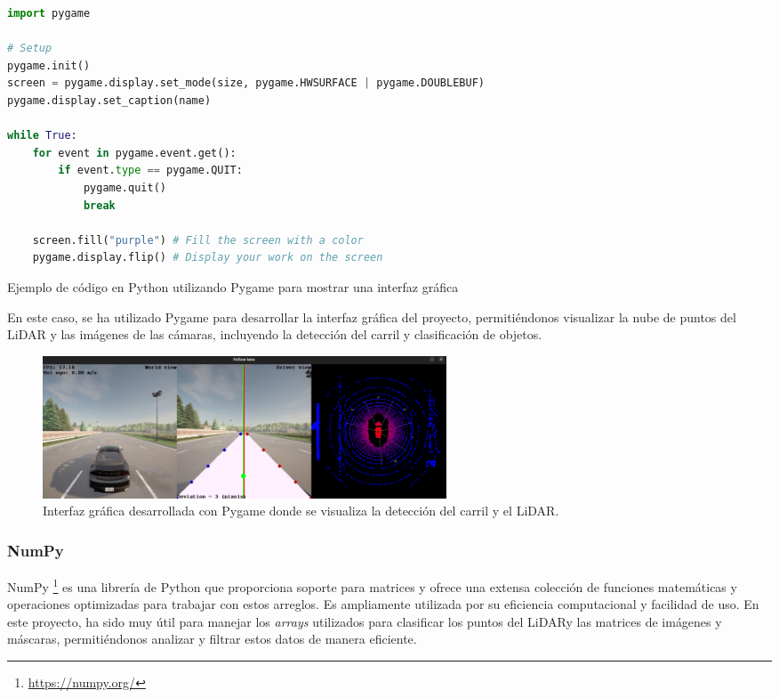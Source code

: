 \begin{code}[h]
\begin{lstlisting}[language=Python]
import pygame

# Setup
pygame.init()
screen = pygame.display.set_mode(size, pygame.HWSURFACE | pygame.DOUBLEBUF)
pygame.display.set_caption(name)

while True:
	for event in pygame.event.get():
		if event.type == pygame.QUIT:
			pygame.quit()
			break

	screen.fill("purple") # Fill the screen with a color
	pygame.display.flip() # Display your work on the screen
\end{lstlisting}
\caption[Ejemplo de código en Python utilizando Pygame]{Ejemplo de código en Python utilizando Pygame para mostrar una interfaz gráfica}
\label{cod:pygame}
\end{code}

En este caso, se ha utilizado Pygame para desarrollar la interfaz gráfica del proyecto, permitiéndonos visualizar la nube de puntos del \ac{LiDAR} y las imágenes de las cámaras, incluyendo la detección del carril y clasificación de objetos.

\begin{figure}[ht]
\begin{center}
\includegraphics[width=12cm]{figs/Plataformas_Desarollo/pygame.png}
\end{center}
\caption{Interfaz gráfica desarrollada con Pygame donde se visualiza la detección del carril y el \ac{LiDAR}.}
\label{foto_pygame}
\end{figure}

\subsubsection{NumPy}
\label{sec:numpy}

NumPy \footnote{\url{https://numpy.org/}} es una librería de Python que proporciona soporte para matrices y ofrece una extensa colección de funciones matemáticas y operaciones optimizadas para trabajar con estos arreglos. Es ampliamente utilizada por su eficiencia computacional y facilidad de uso. En este proyecto, ha sido muy útil para manejar los \textit{arrays} utilizados para clasificar los puntos del \ac{LiDAR}y las matrices de imágenes y máscaras, permitiéndonos analizar y filtrar estos datos de manera eficiente.

